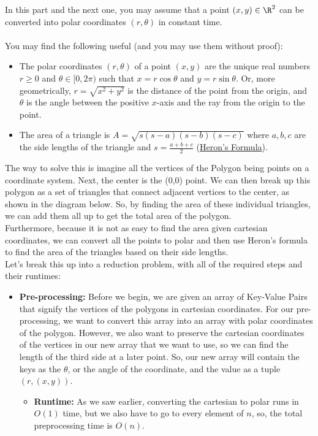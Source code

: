 \documentclass[11pt]{article}
\begin{document}
\begin{enumerate}
\begin{enumerate}
        In this part and the next one, you may assume that a point $(x,y)\in \R^2$ can be converted into polar coordinates $(r,\theta)$ in constant time. 
        \\\\
        You may find the following useful (and you may use them without proof):
        \begin{itemize}
            \item The polar coordinates $(r,\theta)$ of a point $(x,y)$ are the unique real numbers $r\geq 0$ and $\theta\in [0,2\pi)$ such that $x=r\cos \theta$ and $y=r\sin \theta$. Or, more geometrically, $r=\sqrt{x^2+y^2}$ is the distance of the point from the origin, and $\theta$ is the angle between the positive $x$-axis and the ray from the origin to the point.
            \item The area of a triangle is $A = \sqrt{s(s-a)(s-b)(s-c)}$ where $a, b, c$ are the side lengths of the triangle and $s = \frac{a + b + c}{2}$ (\href{https://en.wikipedia.org/wiki/Heron\%27s_formula}{Heron's Formula}).
        \end{itemize}
        The way to solve this is imagine all the vertices of the Polygon being points on a coordinate system. Next, the center is the (0,0) point. We can then break up this polygon as a set of triangles that connect adjacent vertices to the center, as shown in the diagram below. So, by finding the area of these individual triangles, we can add them all up to get the total area of the polygon. 
        \\ Furthermore, because it is not as easy to find the area given cartesian coordinates, we can convert all the points to polar and then use Heron's formula to find the area of the triangles based on their side lengths.
        \\ Let's break this up into a reduction problem, with all of the required steps and their runtimes:
        \begin{itemize}
            \item \textbf{Pre-processing:} Before we begin, we are given an array of Key-Value Pairs that signify the vertices of the polygons in cartesian coordinates. For our pre-processing, we want to convert this array into an array with polar coordinates of the polygon. However, we also want to preserve the cartesian coordinates of the vertices in our new array that we want to use, so we can find the length of the third side at a later point. So, our new array will contain the keys as the $\theta$, or the angle of the coordinate, and the value as a tuple $(r, (x,y))$. 
            \begin{itemize}
                \item \textbf{Runtime:} As we saw earlier, converting the cartesian to polar runs in $O(1)$ time, but we also have to go to every element of $n$, so, the total preprocessing time is $O(n)$.
            \end{itemize}


\end{itemize}
\end{enumerate}
\end{enumerate}
\end{document}
